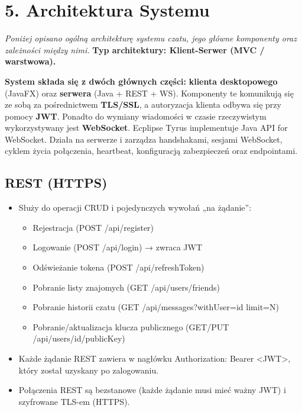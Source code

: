\documentclass[a4paper,12pt]{article}
\begin{document}
\section*{5. Architektura Systemu}
\textit{Poniżej opisano ogólną architekturę systemu czatu, jego główne komponenty oraz zależności między nimi.}
\vspace{0.5 cm}
 \noindent
\textbf{Typ architektury: Klient-Serwer (MVC / warstwowa).}

\textbf{System składa się z dwóch głównych części:}
\textbf{klienta desktopowego} (JavaFX) oraz
\textbf{serwera} (Java + REST + WS). Komponenty te komunikują się ze sobą za pośrednictwem
\textbf{TLS/SSL}, a autoryzacja klienta odbywa się przy pomocy
\textbf{JWT}. Ponadto do wymiany wiadomości w czasie rzeczywistym wykorzystywany jest
\textbf{WebSocket}. Ecplipse Tyrus implementuje Java API for WebSocket. Działa na serwerze i zarządza handshakami, sesjami WebSocket,
cyklem życia połączenia, heartbeat, konfiguracją zabezpieczeń oraz endpointami.


\subsection*{REST (HTTPS)}
\begin{itemize}
    \item Służy do operacji CRUD i pojedynczych wywołań „na żądanie”:
    \begin{itemize}
        \item Rejestracja (POST /api/register)
        \item Logowanie (POST /api/login) → zwraca JWT
        \item Odświeżanie tokena (POST /api/refreshToken)
        \item Pobranie listy znajomych (GET /api/users/friends)
        \item Pobranie historii czatu (GET /api/messages?withUser={id} limit={N})
        \item Pobranie/aktualizacja klucza publicznego (GET/PUT /api/users/{id}/publicKey)
    \end{itemize}
    \item Każde żądanie REST zawiera w nagłówku Authorization: Bearer <JWT>, który został uzyskany po zalogowaniu.
    \item Połączenia REST są bezstanowe (każde żądanie musi mieć ważny JWT) i szyfrowane TLS-em (HTTPS).
\end{itemize}
\end{document}
